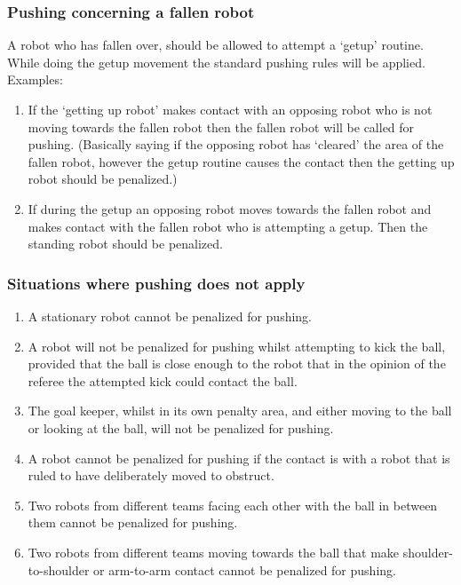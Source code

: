 \documentclass[12pt]{article}
\begin{document}
\subsubsection{Pushing concerning a fallen robot}

A robot who has fallen over, should be allowed to attempt a `getup'
routine. While doing the getup movement the standard pushing rules will be applied. Examples:

\begin{enumerate}

\item If the `getting up robot' makes contact with an opposing robot who is not moving towards the fallen robot then the fallen robot will be called for pushing. (Basically saying if the opposing robot has `cleared' the area of the fallen robot, however the getup routine causes the contact then the getting up robot should be penalized.)

\item If during the getup an opposing robot moves towards the fallen robot and makes contact with the fallen robot who is attempting a getup.
Then the standing robot should be penalized.

\end{enumerate}

\subsubsection{Situations where pushing does not apply}
\label{sec:not_pushing}

\begin{enumerate}

\item A stationary robot cannot be penalized for pushing.

\item A robot will not be penalized for pushing whilst attempting to kick the ball, provided that the ball is close enough to the robot that in the opinion of the referee the attempted kick could contact the ball.

\item The goal keeper, whilst in its own penalty area, and either moving to the ball or looking at the ball, will not be penalized for pushing.

\item A robot cannot be penalized for pushing if the contact is with a robot that is ruled to have deliberately moved to obstruct.

\item Two robots from different teams facing each other with the ball in between them cannot be penalized for pushing.

\item Two robots from different teams moving towards the ball that make shoulder-to-shoulder or arm-to-arm contact cannot be penalized for pushing.

\end{enumerate}
\end{document}
